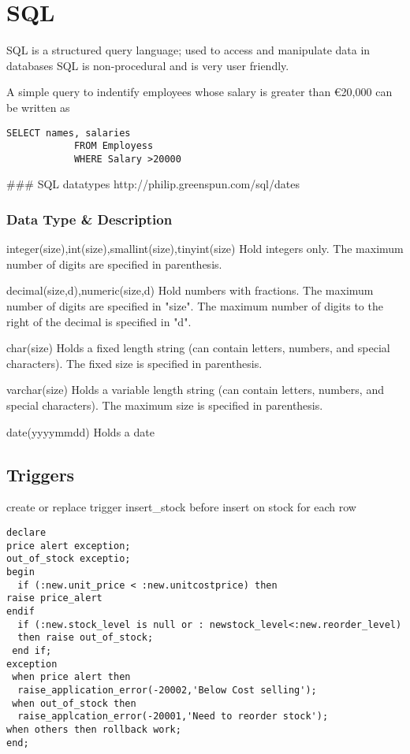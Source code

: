 
\section{SQL} 
SQL is a structured query language; used to access and manipulate data in databases
SQL is non-procedural and is very user friendly.
 
A simple query to indentify employees whose salary is greater than €20,000 can be written as

\begin{framed}
\begin{verbatim}
SELECT names, salaries
            FROM Employess
            WHERE Salary >20000
\end{verbatim}
\end{framed}

### SQL datatypes
http://philip.greenspun.com/sql/dates

\subsubsection{Data Type & Description }

integer(size),int(size),smallint(size),tinyint(size)     Hold integers only. The maximum number of digits  are  specified in parenthesis. 

decimal(size,d),numeric(size,d)  Hold numbers with fractions. The maximum number of digits are specified in "size". The maximum number of digits to the right of the decimal is specified in "d". 

char(size)  Holds a fixed length string (can contain letters, numbers, and special characters). The fixed size is specified in parenthesis. 

varchar(size)  Holds a variable length string (can contain letters, numbers, and special characters). The maximum size is specified in parenthesis. 

date(yyyymmdd)   Holds a date 

\subsection{Triggers}
create or replace trigger insert_stock
before insert on stock for each row

\begin{framed}
\begin{verbatim}
declare 
price alert exception;
out_of_stock exceptio;
begin
  if (:new.unit_price < :new.unitcostprice) then
raise price_alert
endif
  if (:new.stock_level is null or : newstock_level<:new.reorder_level)
  then raise out_of_stock;
 end if;
exception
 when price alert then
  raise_application_error(-20002,'Below Cost selling');
 when out_of_stock then
  raise_applcation_error(-20001,'Need to reorder stock');
when others then rollback work;
end;
\end{verbatim}
\end{framed}

